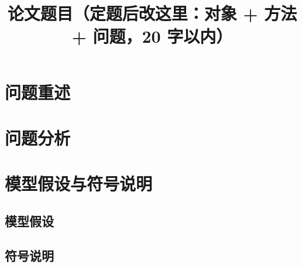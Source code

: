 \documentclass[withoutpreface,bwprint]{cumcmthesis}
\title{论文题目（定题后改这里：对象 + 方法 + 问题，20 字以内）}
\begin{document}
\maketitle

\begin{abstract}
%
%
%
\end{abstract}

\section{问题重述}

\section{问题分析}

\section{模型假设与符号说明}
\subsection{模型假设}

\subsection{符号说明}
\end{document}
